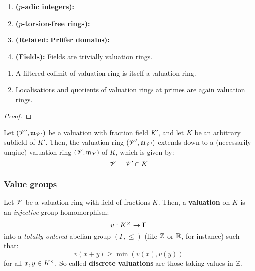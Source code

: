            \begin{example} \label{example: valuation_rings}
                \noindent
                \begin{enumerate}
                    \item \textbf{($p$-adic integers):}
                    \item \textbf{($p$-torsion-free rings):}
                    \item \textbf{(Related: Pr\"ufer domains):}
                    \item \textbf{(Fields):} Fields are trivially valuation rings. 
                \end{enumerate}
            \end{example}
            
            \begin{proposition} \label{prop: colimits_of_valuation_rings}
                \noindent
                \begin{enumerate}
                    \item A filtered colimit of valuation ring is itself a valuation ring.
                    \item Localisations and quotients of valuation rings at primes are again valuation rings. 
                \end{enumerate}
            \end{proposition}
                \begin{proof}
                    
                \end{proof}
                
            \begin{proposition} \label{prop: extensions of valuation rings}
                Let $(\mathscr{V}', \mathfrak{m}_{\mathscr{V}'})$ be a valuation with fraction field $K'$, and let $K$ be an arbitrary subfield of $K'$. Then, the valuation ring $(\mathscr{V}', \mathfrak{m}_{\mathscr{V}'})$ extends down to a (necessarily unqiue) valuation ring $(\mathscr{V}, \mathfrak{m}_{\mathscr{V}})$ of $K$, which is given by:
                    $$\mathscr{V} = \mathscr{V}' \cap K$$
            \end{proposition}
        
        \subsubsection{Value groups}
            \begin{definition}[Valuations] \label{def: valuations}
                Let $\mathscr{V}$ be a valuation ring with field of fractions $K$. Then, a \textbf{valuation} on $K$ is an \textit{injective} group homomorphism:
                    $$v: K^{\x} \to \Gamma$$
                into a \textit{totally ordered} abelian group $(\Gamma, \leq)$ (like $\mathbb{Z}$ or $\mathbb{R}$, for instance) such that:
                    $$v(x + y) \geq \min(v(x), v(y))$$
                for all $x, y \in K^{\x}$. So-called \textbf{discrete valuations} are those taking values in $\mathbb{Z}$. 
            \end{definition}
            
